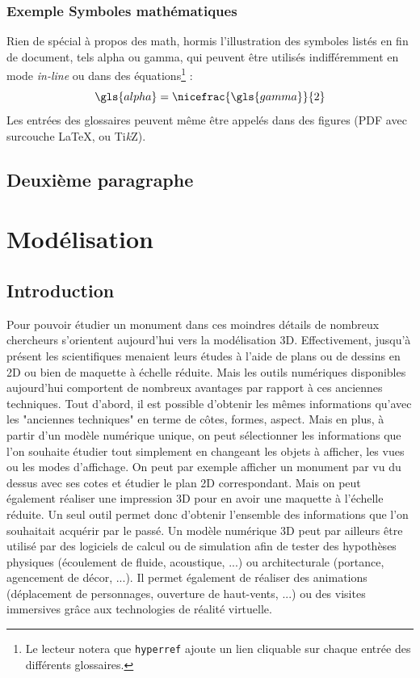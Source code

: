 			\subsection{Exemple Symboles mathématiques}
			Rien de spécial à propos des math, hormis l'illustration des symboles listés en fin de document, tels \gls{alpha} ou \gls{gamma}, qui peuvent être utilisés indifféremment en mode \emph{in-line} ou dans des équations\footnote{Le lecteur notera que \texttt{hyperref} ajoute un lien cliquable sur chaque entrée des différents glossaires.} :
			\begin{equation}
				\gls{alpha}=\nicefrac{\gls{gamma}}{2}
				\label{eq:alphagamma}
			\end{equation}
			Les entrées des glossaires peuvent même être appelés dans des figures (PDF avec surcouche \LaTeX, ou Ti\textit{k}Z).
	

		\section{Deuxième paragraphe}
			\blindtext




	\chapter{Modélisation}
		\minitoc
		\newpage
		
		\section{Introduction}
		Pour pouvoir étudier un monument dans ces moindres détails de nombreux chercheurs s'orientent aujourd'hui vers la modélisation 3D. Effectivement, jusqu'à présent les scientifiques menaient leurs études à l'aide de plans ou de dessins en 2D ou bien de maquette à échelle réduite. Mais les outils numériques disponibles aujourd'hui comportent de nombreux avantages par rapport à ces anciennes techniques. Tout d'abord, il est possible d'obtenir les mêmes informations qu'avec les "anciennes techniques" en terme de côtes, formes, aspect. Mais en plus, à partir d'un modèle numérique unique, on peut sélectionner les informations que l'on souhaite étudier tout simplement en changeant les objets à afficher, les vues ou les modes d'affichage. On peut par exemple afficher un monument par vu du dessus avec ses cotes et étudier le plan 2D correspondant. Mais on peut également réaliser une impression 3D pour en avoir une maquette à l'échelle réduite. Un seul outil permet donc d'obtenir l'ensemble des informations que l'on souhaitait acquérir par le passé. Un modèle numérique 3D peut par ailleurs être utilisé par des logiciels de calcul ou de simulation afin de tester des hypothèses physiques (écoulement de fluide, acoustique, ...) ou architecturale (portance, agencement de décor, ...). Il permet également de réaliser des animations (déplacement de personnages, ouverture de haut-vents, ...) ou des visites immersives grâce aux technologies de réalité virtuelle. 

